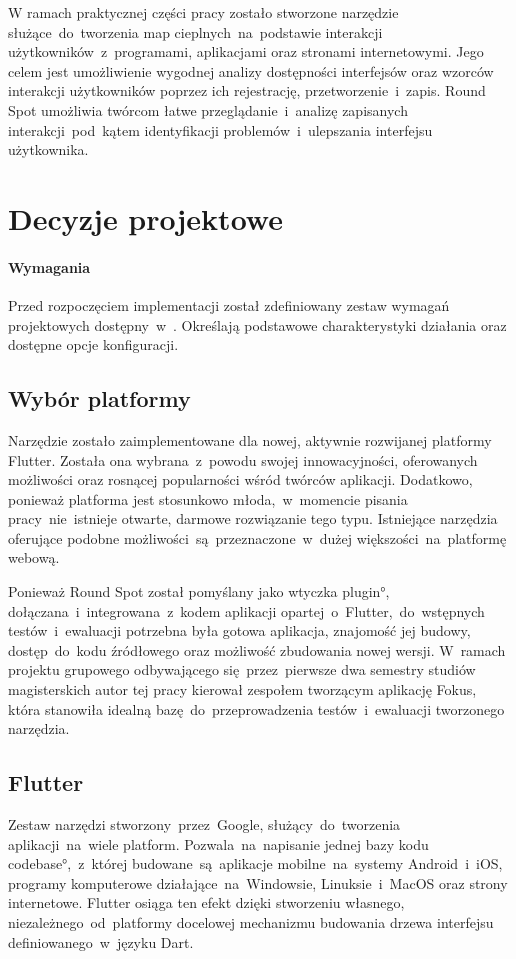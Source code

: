 W ramach praktycznej części pracy zostało stworzone narzędzie służące~do~tworzenia map cieplnych~na~podstawie interakcji użytkowników~z~programami, aplikacjami oraz stronami internetowymi. Jego celem jest umożliwienie wygodnej analizy dostępności interfejsów oraz wzorców interakcji użytkowników poprzez ich rejestrację, przetworzenie~i~zapis. Round Spot umożliwia twórcom łatwe przeglądanie~i~analizę zapisanych interakcji~pod~kątem identyfikacji problemów~i~ulepszania interfejsu użytkownika.

\section{Decyzje projektowe}

\paragraph{Wymagania} Przed rozpoczęciem implementacji został zdefiniowany zestaw wymagań projektowych dostępny~w~. Określają podstawowe charakterystyki działania oraz dostępne opcje konfiguracji.

\subsection{Wybór platformy}
Narzędzie zostało zaimplementowane dla nowej, aktywnie rozwijanej platformy Flutter. Została ona wybrana~z~powodu swojej innowacyjności, oferowanych możliwości oraz rosnącej popularności wśród twórców aplikacji. Dodatkowo, ponieważ platforma jest stosunkowo młoda,~w~momencie pisania pracy~nie~istnieje otwarte, darmowe rozwiązanie tego typu. Istniejące narzędzia oferujące podobne możliwości~są~przeznaczone~w~dużej większości~na~platformę webową.

Ponieważ Round Spot został pomyślany jako wtyczka \ang{plugin}, dołączana~i~integrowana~z~kodem aplikacji opartej~o~Flutter,~do~wstępnych testów~i~ewaluacji potrzebna była gotowa aplikacja, znajomość jej budowy, dostęp~do~kodu źródłowego oraz możliwość zbudowania nowej wersji. W~ramach projektu grupowego odbywającego się~przez~pierwsze dwa semestry studiów magisterskich autor tej pracy kierował zespołem tworzącym aplikację Fokus, która stanowiła idealną bazę~do~przeprowadzenia testów~i~ewaluacji tworzonego narzędzia.

\subsection{Flutter}
Zestaw narzędzi stworzony~przez~Google, służący~do~tworzenia aplikacji~na~wiele platform. Pozwala~na~napisanie jednej bazy kodu \ang{codebase},~z~której budowane~są~aplikacje mobilne~na~systemy Android~i~iOS, programy komputerowe działające~na~Windowsie, Linuksie~i~MacOS oraz strony internetowe. Flutter osiąga ten efekt dzięki stworzeniu własnego, niezależnego~od~platformy docelowej mechanizmu budowania drzewa interfejsu definiowanego~w~języku Dart. 

